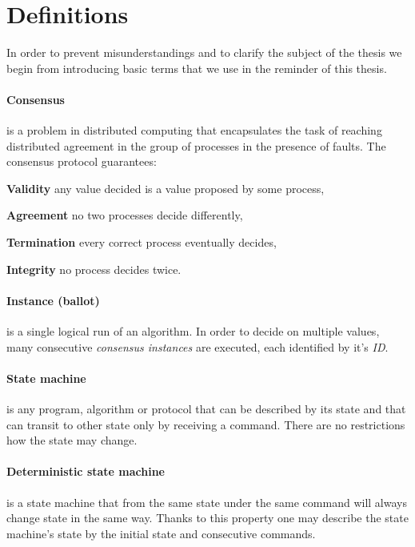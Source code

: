 \clearpage

\section{Definitions}

In order to prevent misunderstandings and to clarify the subject of the thesis we begin from introducing
basic %
terms that we use in the reminder of this thesis.


\paragraph{Consensus}
is a problem in distributed computing that encapsulates the task of reaching distributed agreement in the group of processes in the presence of faults.
The consensus protocol guarantees:

\begin{tightList}[\setlength{\leftmargin}{2\leftmargin}]
    \item[\textbf{Validity}] any value decided is a value proposed by some process,
    \item[\textbf{Agreement}] no two processes decide differently,
    \item[\textbf{Termination}] every correct process eventually decides,
    \item[\textbf{Integrity}] no process decides twice.
\end{tightList}

\paragraph{Instance (ballot)} is a single logical run of an algorithm. In order to decide on multiple values, many consecutive \textit{consensus instances} are executed, each identified by it's \textit{ID}.

\paragraph{State machine}
is any program, algorithm or protocol that can be described by its state and that can transit to other state only by receiving a command.
There are no restrictions how the state may change.

\paragraph{Deterministic state machine}
is a state machine that from the same state under the same command will always change state in the same way.
Thanks to this property one may describe the state machine's state by the initial state and consecutive commands. 

